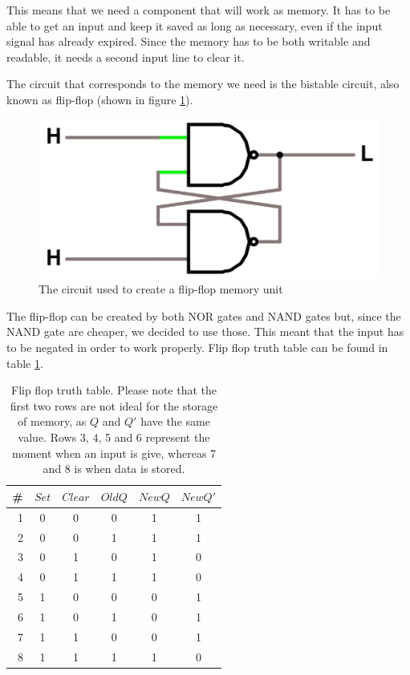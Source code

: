 \documentclass{article}
\begin{document}
\vspace{1mm}

This means that we need a component that will work as memory. It has to be able to get an input and keep it saved as long as necessary, even if the input signal has already expired. Since the memory has to be both writable and readable, it needs a second input line to clear it.

\vspace{3mm}

The circuit that corresponds to the memory we need is the bistable circuit, also known as flip-flop (shown in figure \ref{FlipFlop}).

\begin{figure}[h]
    \centering
    \includegraphics[scale=.3]{IM_FlipFlop}
    \caption{The circuit used to create a flip-flop memory unit}
    \label{FlipFlop}   
\end{figure}

The flip-flop can be created by both NOR gates and NAND gates but, since the NAND gate are cheaper, we decided to use those. This meant that the input has to be negated in order to work properly. Flip flop truth table can be found in table \ref{FlipFlopTT}.


\begin{table}[h]
\centering
\begin{tabular}{ | c | c  c  c | c  c |}
\hline
 \# & $Set$ & $Clear$ & $Old Q$ & $New Q$ & $New Q'$\\
\hline
 \ 1 & 0 & 0 & 0 & 1 & 1 \\ 
 \ 2 & 0 & 0 & 1 & 1 & 1 \\
\hline 
 \ 3 & 0 & 1 & 0 & 1 & 0 \\ 
 \ 4 & 0 & 1 & 1 & 1 & 0 \\ 
 \ 5 & 1 & 0 & 0 & 0 & 1 \\
 \ 6 & 1 & 0 & 1 & 0 & 1 \\
\hline
 \ 7 & 1 & 1 & 0 & 0 & 1 \\
 \ 8 & 1 & 1 & 1 & 1 & 0 \\ 
\hline
\end{tabular}
\caption{Flip flop truth table. Please note that the first two rows are not ideal for the storage of memory, as $Q$ and $Q'$ have the same value. Rows 3, 4, 5 and 6 represent the moment when an input is give, whereas 7 and 8 is when data is stored.}
\label{FlipFlopTT}
\end{table}
\end{document}
